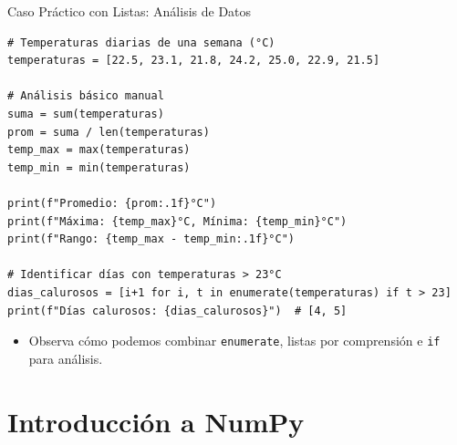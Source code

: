 \documentclass[10pt]{beamer}
\begin{document}
\begin{frame}[fragile]{Caso Práctico con Listas: Análisis de Datos}
\begin{verbatim}
# Temperaturas diarias de una semana (°C)
temperaturas = [22.5, 23.1, 21.8, 24.2, 25.0, 22.9, 21.5]

# Análisis básico manual
suma = sum(temperaturas)
prom = suma / len(temperaturas)
temp_max = max(temperaturas)
temp_min = min(temperaturas)

print(f"Promedio: {prom:.1f}°C")
print(f"Máxima: {temp_max}°C, Mínima: {temp_min}°C")
print(f"Rango: {temp_max - temp_min:.1f}°C")

# Identificar días con temperaturas > 23°C
dias_calurosos = [i+1 for i, t in enumerate(temperaturas) if t > 23]
print(f"Días calurosos: {dias_calurosos}")  # [4, 5]
\end{verbatim}
\begin{itemize}
  \item Observa cómo podemos combinar \texttt{enumerate}, listas por comprensión e \texttt{if} para análisis.
\end{itemize}
\end{frame}



\section{Introducción a NumPy}
\end{document}
